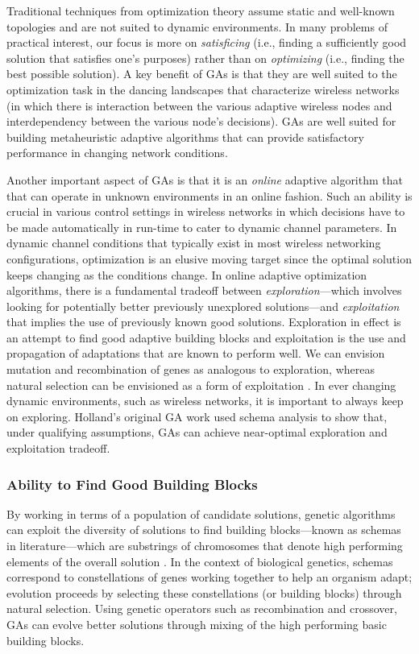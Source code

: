 \documentclass[journal]{IEEEtran}
\begin{document}
Traditional techniques from optimization theory assume static and well-known topologies and are not suited to dynamic environments. In many problems of practical interest, our focus is more on \textit{satisficing} (i.e., finding a sufficiently good solution that satisfies one's purposes) rather than on \textit{optimizing} (i.e., finding the best possible solution). A key benefit of GAs is that they are well suited to the optimization task in the dancing landscapes that characterize wireless networks (in which there is interaction between the various adaptive wireless nodes and interdependency between the various node's decisions). GAs are well suited for building metaheuristic adaptive algorithms that can provide satisfactory performance in changing network conditions. 

Another important aspect of GAs is that it is an \textit{online} adaptive algorithm that that can operate in unknown environments in an online fashion. Such an ability is crucial in various control settings in wireless networks in which decisions have to be made automatically in run-time to cater to dynamic channel parameters. In dynamic channel conditions that typically exist in most wireless networking configurations, optimization is an elusive moving target since the optimal solution keeps changing as the conditions change. In online adaptive optimization algorithms, there is a fundamental tradeoff between \textit{exploration}---which involves looking for potentially better previously unexplored solutions---and \textit{exploitation} that implies the use of previously known good solutions. Exploration in effect is an attempt to find good adaptive building blocks and exploitation is the use and propagation of adaptations that are known to perform well. We can envision mutation and recombination of genes as analogous to exploration, whereas natural selection can be envisioned as a form of exploitation \cite{page2010diversity}. In ever changing dynamic environments, such as wireless networks, it is important to always keep on exploring. Holland's original GA work used schema analysis to show that, under qualifying assumptions, GAs can achieve near-optimal exploration and exploitation tradeoff.

\vspace{2mm}
\subsubsection{Ability to Find Good Building Blocks}

By working in terms of a population of candidate solutions, genetic algorithms can exploit the diversity of solutions to find building blocks---known as schemas in literature---which are substrings of chromosomes that denote high performing elements of the overall solution \cite{holland1975genetic}. In the context of biological genetics, schemas correspond to constellations of genes working together to help an organism adapt; evolution proceeds by selecting these constellations  (or building blocks) through natural selection. Using genetic operators such as recombination and crossover, GAs can evolve better solutions through mixing of the high performing basic building blocks.
\end{document}
